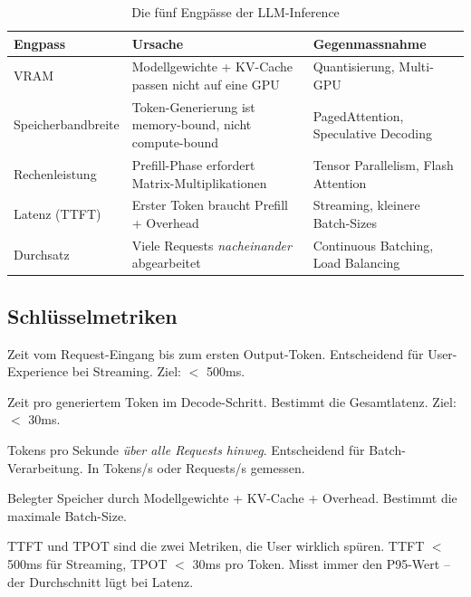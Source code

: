 \begin{table}[H]
\centering
\begin{tabularx}{\linewidth}{lXl}
\toprule
\textbf{Engpass} & \textbf{Ursache} & \textbf{Gegenmassnahme} \\
\midrule
VRAM & Modellgewichte + KV-Cache passen nicht auf eine GPU & Quantisierung, Multi-GPU \\
Speicherbandbreite & Token-Generierung ist memory-bound, nicht compute-bound & PagedAttention, Speculative Decoding \\
Rechenleistung & Prefill-Phase erfordert Matrix-Multiplikationen & Tensor Parallelism, Flash Attention \\
Latenz (TTFT) & Erster Token braucht Prefill + Overhead & Streaming, kleinere Batch-Sizes \\
Durchsatz & Viele Requests \textit{nacheinander} abgearbeitet & Continuous Batching, Load Balancing \\
\bottomrule
\end{tabularx}
\caption{Die fünf Engpässe der LLM-Inference}
\label{tab:inference-engpässe}
\end{table}

\subsection{Schlüsselmetriken}

\begin{description}[leftmargin=*,style=nextline]
    \item[TTFT (Time to First Token)] Zeit vom Request-Eingang bis zum ersten Output-Token. Entscheidend für User-Experience bei Streaming. Ziel: $<$ 500ms.
    \item[TPOT (Time per Output Token)] Zeit pro generiertem Token im Decode-Schritt. Bestimmt die Gesamtlatenz. Ziel: $<$ 30ms.
    \item[Durchsatz (Throughput)] Tokens pro Sekunde \textit{über alle Requests hinweg}. Entscheidend für Batch-Verarbeitung. In Tokens/s oder Requests/s gemessen.
    \item[VRAM-Auslastung] Belegter Speicher durch Modellgewichte + KV-Cache + Overhead. Bestimmt die maximale Batch-Size.
\end{description}

\begin{praxishinweis}
TTFT und TPOT sind die zwei Metriken, die User wirklich spüren. TTFT $<$ 500ms für Streaming, TPOT $<$ 30ms pro Token. Misst immer den P95-Wert -- der Durchschnitt lügt bei Latenz.
\end{praxishinweis}

